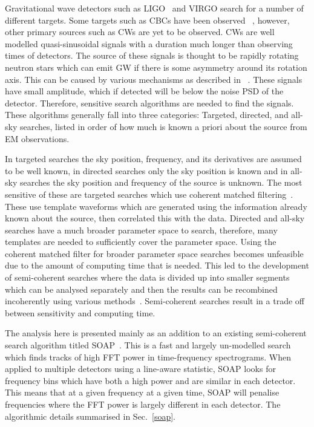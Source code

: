 %
Gravitational wave detectors such as \gls{LIGO}~\cite{abbott2009LIGOLaser,aasi2015AdvancedLIGO} and VIRGO
\cite{acernese2015AdvancedVirgo,acernese2008StatusVirgo} search for a number of different targets. 
Some targets such as \glspl{CBC} have been observed ~\cite{abbott2017GW170817Observation,abbott2017GW170814ThreeDetector,abbott2016ObservationGravitational},
however, other primary sources such as \glspl{CW} are yet to be observed.
\glspl{CW} are well modelled quasi-sinusoidal signals with a
duration much longer than observing times of detectors.
The source of these signals is thought to be rapidly rotating neutron stars which can emit \gls{GW} if there is some asymmetry around its rotation axis. 
This can be caused by various mechanisms as described in ~\cite{prix2009GravitationalWaves}. 
These signals have small amplitude, which if detected will be below the noise \gls{PSD} of the detector.
Therefore, sensitive search algorithms are needed to find the signals. 
These algorithms generally fall into three categories: Targeted,
directed, and all-sky searches, listed in order of how much is known a priori
about the source from \gls{EM} observations. 

%
In targeted searches the sky position, frequency, and its derivatives are
assumed to be well known, in directed searches only the sky position is
known and in all-sky searches the sky position and frequency of the source is unknown.
The most sensitive of these are targeted searches which use coherent matched
filtering~\cite{dupuis2005BayesianEstimation,schutz1998DataAnalysis}. These use
template waveforms which are generated using the information already known about the
source, then correlated this with the data. Directed and all-sky searches have
a much broader parameter space to search, therefore, many templates are needed
to sufficiently cover the parameter space. Using the coherent matched filter
for broader parameter space searches becomes unfeasible due to the amount of
computing time that is needed. This led to the development of semi-coherent
searches where the data is divided up into smaller segments which can be analysed
separately and then the results can be recombined incoherently using various
methods~\cite{abbott2019AllskySearch,creighton2000SearchingPeriodic}. Semi-coherent
searches result in a trade off between sensitivity and computing time.

%
The analysis here is presented mainly as an addition to an existing
semi-coherent search algorithm titled SOAP~\cite{bayley2019SOAPGeneralised}.
This is a fast and largely un-modelled search which finds tracks of
high \gls{FFT} power in time-frequency spectrograms. 
When applied to multiple detectors using a line-aware statistic, SOAP looks for frequency bins which have both a high power and are similar in each detector. 
This means that  at a given frequency at a given time, SOAP will penalise frequencies where the \gls{FFT} power is largely different in each detector.  
The algorithmic details summarised in Sec.~\ref{soap}. 

